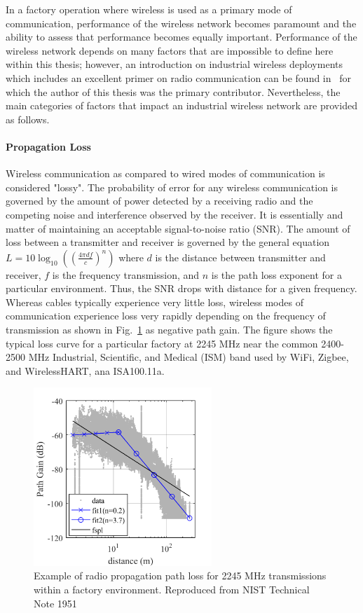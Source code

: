 {In a factory operation where wireless is used as a primary mode of communication, performance of the wireless network becomes paramount and the ability to assess that performance becomes equally important.  Performance of the wireless network depends on many factors that are impossible to define here within this thesis; however, an introduction on industrial wireless deployments which includes an excellent primer on radio communication can be found in~\cite{Candell2018.IWSGuide} for which the author of this thesis was the primary contributor.  Nevertheless, the main categories of factors that impact an industrial wireless network are provided as follows.

\paragraph{Propagation Loss} Wireless communication as compared to wired modes of communication is considered "lossy".  The probability of error for any wireless communication is governed by the amount of power detected by a receiving radio and the competing noise and interference observed by the receiver.  It is essentially and matter of maintaining an acceptable signal-to-noise ratio (SNR). The amount of loss between a transmitter and receiver is governed by the general equation $L=10\log_{10}\left(\left(\frac{4\pi d f}{c}\right)^n\right)$ where $d$ is the distance between transmitter and receiver, $f$ is the frequency transmission, and $n$ is the path loss exponent for a particular environment.  Thus, the SNR drops with distance for a given frequency.  Whereas cables typically experience very little loss, wireless modes of communication experience loss very rapidly depending on the frequency of transmission as shown in Fig.~\ref{intro:pathloss-example} as negative path gain.  The figure shows the typical loss curve for a particular factory at 2245 MHz near the common 2400-2500 MHz Industrial, Scientific, and Medical (ISM) band used by WiFi, Zigbee, and WirelessHART, ana ISA100.11a.

\begin{figure}
	\centering
	\includegraphics[width=0.6\textwidth]{chapter-intro/images/gain2245}
	\caption{Example of radio propagation path loss for 2245 MHz transmissions within a factory environment.  Reproduced from NIST Technical Note 1951~\cite{Candell2017.NIST1951}}
	\label{intro:pathloss-example}
\end{figure}
 
}
